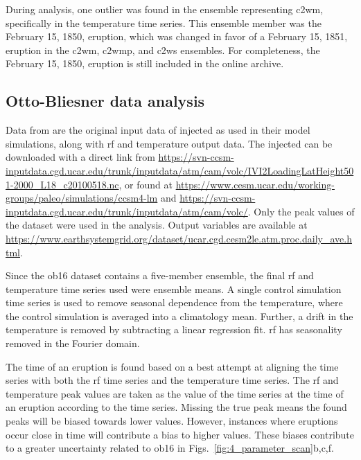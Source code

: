 \documentclass{ametsocV6.1}
\newcommand{\iso}[1][i]{{#1}njected \ce{SO2}}
\begin{document}
During analysis, one outlier was found in the ensemble representing \gls{c2wm},
specifically in the temperature time series. This ensemble member was the February 15,
1850, eruption, which was changed in favor of a February 15, 1851, eruption in the
\gls{c2wm}, \gls{c2wmp}, and \gls{c2ws} ensembles. For completeness, the February 15,
1850, eruption is still included in the online archive.

\appendix[B]


\subsection{Otto-Bliesner data analysis}\label{ap:ob16}

Data from \citet{ottobliesner2016} are the original input data of \iso{} as used in
their model simulations, along with \gls{rf} and temperature output data. The \iso{} can
be downloaded with a direct link from
\url{https://svn-ccsm-inputdata.cgd.ucar.edu/trunk/inputdata/atm/cam/volc/IVI2LoadingLatHeight501-2000_L18_c20100518.nc},
or found at \url{https://www.cesm.ucar.edu/working-groups/paleo/simulations/ccsm4-lm}
and \url{https://svn-ccsm-inputdata.cgd.ucar.edu/trunk/inputdata/atm/cam/volc/}. Only
the peak values of the  dataset were used in the analysis. Output variables are
available at
\url{https://www.earthsystemgrid.org/dataset/ucar.cgd.cesm2le.atm.proc.daily_ave.html}.

Since the \gls{ob16} dataset contains a five-member ensemble, the final \gls{rf} and
temperature time series used were ensemble means. A single control simulation time
series is used to remove seasonal dependence from the temperature, where the control
simulation is averaged into a climatology mean. Further, a drift in the temperature is
removed by subtracting a linear regression fit. \gls{rf} has seasonality removed in the
Fourier domain.

The time of an eruption is found based on a best attempt at aligning the  time
series with both the \gls{rf} time series and the temperature time series. The \gls{rf}
and temperature peak values are taken as the value of the time series at the time of an
eruption according to the  time series. Missing the true peak means the found
peaks will be biased towards lower values. However, instances where eruptions occur
close in time will contribute a bias to higher values. These biases contribute to a
greater uncertainty related to \gls{ob16} in Figs.~\ref{fig:4_parameter_scan}b,c,f.
\end{document}
